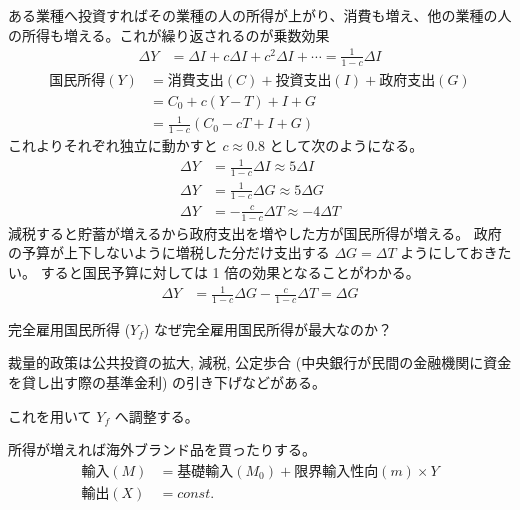 \documentclass[uplatex,dvipdfmx,a4paper,11pt]{jlreq}
\numberwithin{equation}{section}
\theoremstyle{definition}
\begin{document}
ある業種へ投資すればその業種の人の所得が上がり、消費も増え、他の業種の人の所得も増える。これが繰り返されるのが乗数効果
\begin{align}
  \Delta Y & = \Delta I + c\Delta I + c^2\Delta I +\cdots = \frac{1}{1 - c}\Delta I
\end{align}
\begin{align}
  国民所得 (Y) & = 消費支出 (C) + 投資支出 (I) + 政府支出 (G)    \\
           & = C_0 + c(Y - T) + I + G            \\
           & = \frac{1}{1 - c}(C_0 - cT + I + G)
\end{align}
これよりそれぞれ独立に動かすと $c \approx 0.8$ として次のようになる。
\begin{align}
  \Delta Y & = \frac{1}{1 - c}\Delta I \approx 5\Delta I   \\
  \Delta Y & = \frac{1}{1 - c}\Delta G \approx 5\Delta G   \\
  \Delta Y & = -\frac{c}{1 - c}\Delta T \approx -4\Delta T
\end{align}
減税すると貯蓄が増えるから政府支出を増やした方が国民所得が増える。
政府の予算が上下しないように増税した分だけ支出する $\Delta G = \Delta T$ ようにしておきたい。
すると国民予算に対しては 1 倍の効果となることがわかる。
\begin{align}
  \Delta Y & = \frac{1}{1 - c}\Delta G - \frac{c}{1 - c}\Delta T = \Delta G
\end{align}

完全雇用国民所得 ($Y_f$)
なぜ完全雇用国民所得が最大なのか？

裁量的政策は公共投資の拡大, 減税, 公定歩合 (中央銀行が民間の金融機関に資金を貸し出す際の基準金利) の引き下げなどがある。

これを用いて $Y_f$ へ調整する。

所得が増えれば海外ブランド品を買ったりする。
\begin{align}
  輸入 (M) & = 基礎輸入 (M_0) + 限界輸入性向 (m) \times Y \\
  輸出 (X) & = const.
\end{align}
\end{document}
